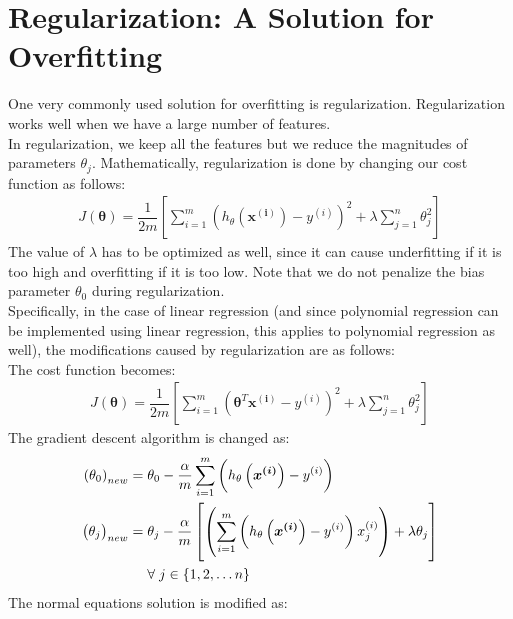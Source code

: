 \documentclass[a4paper, 12pt]{report}
\begin{document}
\section{Regularization: A Solution for Overfitting}
One very commonly used solution for overfitting is regularization. Regularization works well when we have a large number of features.\\
\break
In regularization, we keep all the features but we reduce the magnitudes of parameters $\theta_j$. Mathematically, regularization is done by changing our cost function as follows:
\begin{align*}
J\left(\bm{\theta}\right) = \dfrac{1}{2m}\left[\sum_{i=1}^{m}\left(h_{\theta}\left(\bm{x^{\left(i\right)}}\right)-y^{\left(i\right)}\right)^2 + \lambda\sum_{j=1}^{n}\theta_j^2\right]
\end{align*}
The value of $\lambda$ has to be optimized as well, since it can cause underfitting if it is too high and overfitting if it is too low. Note that we do not penalize the bias parameter $\theta_0$ during regularization.\\
\break
Specifically, in the case of linear regression (and since polynomial regression can be implemented using linear regression, this applies to polynomial regression as well), the modifications caused by regularization are as follows: \\
\break
The cost function becomes:
\begin{align*}
J\left(\bm{\theta}\right) = \dfrac{1}{2m}\left[\sum_{i=1}^{m}\left(\bm{\theta}^T\bm{x^{\left(i\right)}}-y^{\left(i\right)}\right)^2 + \lambda\sum_{j=1}^{n}\theta_j^2\right]
\end{align*}
The gradient descent algorithm is changed as:
\begin{align*}
\left(\theta_0\right)_{new} =& \hspace{1mm} \theta_0 - \dfrac{\alpha}{m}\sum_{i=1}^{m}\left(h_{\theta}\left(\bm{x^{\left(i\right)}}\right)-y^{\left(i\right)}\right) \\
\left(\theta_j\right)_{new} =& \hspace{1mm} \theta_j - \dfrac{\alpha}{m}\left[\left(\sum_{i=1}^{m}\left(h_{\theta}\left(\bm{x^{\left(i\right)}}\right)-y^{\left(i\right)}\right)x^{\left(i\right)}_j\right) + \lambda\theta_j\right] \\
& \hspace{1mm} \forall \hspace{1mm} j \in \{1, 2, \dots n\}
\end{align*}
The normal equations solution is modified as:
\end{document}
